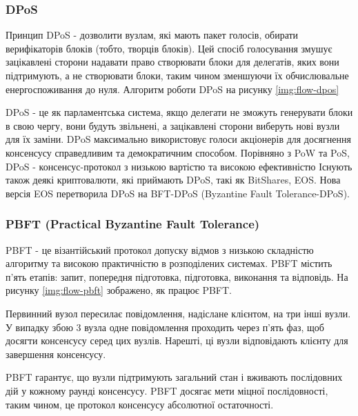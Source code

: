 \documentclass{lib/styles/default-style}
\begin{document}
    \subsubsection{DPoS}

    Принцип DPoS - дозволити вузлам, які мають пакет голосів,
    обирати верифікаторів блоків (тобто, творців блоків).
    Цей спосіб голосування змушує зацікавлені сторони надавати право створювати блоки для делегатів, яких вони підтримують,
    а не створювати блоки, таким чином зменшуючи їх обчислювальне енергоспоживання до нуля.
    Алгоритм роботи DPoS на рисунку \ref{img:flow-dpos}

    
    DPoS - це як парламентська система, якщо делегати не зможуть генерувати блоки в свою чергу,
    вони будуть звільнені, а зацікавлені сторони виберуть нові вузли для їх заміни. DPoS максимально використовує
    голоси акціонерів для досягнення консенсусу справедливим та демократичним способом.
    Порівняно з PoW та PoS, DPoS - консенсус-протокол з низькою вартістю та високою ефективністю
    Існують також деякі криптовалюти, які приймають DPoS, такі як BitShares, EOS.
    Нова версія EOS перетворила DPoS на BFT-DPoS (Byzantine Fault Tolerance-DPoS).

    \subsubsection{PBFT (Practical Byzantine Fault Tolerance)}

    PBFT - це візантійський протокол допуску відмов з низькою складністю алгоритму та високою практичністю в розподілених системах.
    PBFT містить п’ять етапів: запит, попередня підготовка, підготовка, виконання та відповідь. На рисунку \ref{img:flow-pbft}
    зображено, як працює PBFT.


    Первинний вузол пересилає повідомлення, надіслане клієнтом, на три інші вузли.
    У випадку збою 3 вузла одне повідомлення проходить через п'ять фаз, щоб досягти консенсусу серед цих вузлів.
    Нарешті, ці вузли відповідають клієнту для завершення консенсусу.

    PBFT гарантує, що вузли підтримують загальний стан і вживають послідовних дій у кожному раунді консенсусу.
    PBFT досягає мети міцної послідовності, таким чином, це протокол консенсусу абсолютної остаточності.
    
\end{document}
